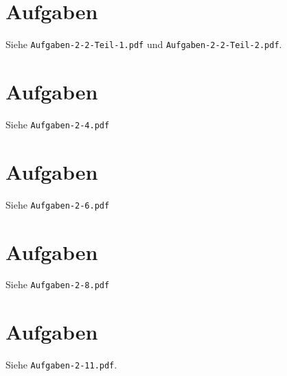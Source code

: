 \documentclass[
 a4paper,
 12pt,
 parskip=half
 ]{scrreprt}
\theoremstyle{plain}
\theoremstyle{definition}
\numberwithin{equation}{section}
\begin{document}
\section{Aufgaben}
Siehe \verb+Aufgaben-2-2-Teil-1.pdf+ und \verb+Aufgaben-2-2-Teil-2.pdf+.



\section{Aufgaben}
Siehe \verb+Aufgaben-2-4.pdf+



\section{Aufgaben}
Siehe \verb+Aufgaben-2-6.pdf+



\section{Aufgaben}
Siehe \verb+Aufgaben-2-8.pdf+





\section{Aufgaben}
Siehe \verb+Aufgaben-2-11.pdf+.





\addtocounter{section}{2}


\end{document}
